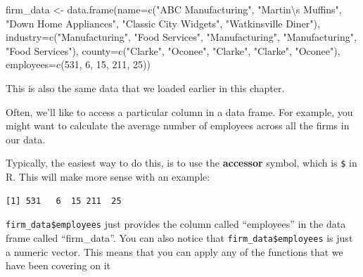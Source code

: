 \documentclass[
  letterpaper,
  DIV=11,
  numbers=noendperiod]{scrreprt}
\newenvironment{Shaded}{\begin{snugshade}}{\end{snugshade}}
\newcommand{\AttributeTok}[1]{\textcolor[rgb]{0.40,0.45,0.13}{#1}}
\newcommand{\DecValTok}[1]{\textcolor[rgb]{0.68,0.00,0.00}{#1}}
\newcommand{\FunctionTok}[1]{\textcolor[rgb]{0.28,0.35,0.67}{#1}}
\newcommand{\NormalTok}[1]{\textcolor[rgb]{0.00,0.23,0.31}{#1}}
\newcommand{\OtherTok}[1]{\textcolor[rgb]{0.00,0.23,0.31}{#1}}
\newcommand{\SpecialCharTok}[1]{\textcolor[rgb]{0.37,0.37,0.37}{#1}}
\newcommand{\StringTok}[1]{\textcolor[rgb]{0.13,0.47,0.30}{#1}}
\begin{document}
\begin{Shaded}
\begin{Highlighting}[]
\NormalTok{firm\_data }\OtherTok{\textless{}{-}} \FunctionTok{data.frame}\NormalTok{(}\AttributeTok{name=}\FunctionTok{c}\NormalTok{(}\StringTok{"ABC Manufacturing"}\NormalTok{, }\StringTok{"Martin}\SpecialCharTok{\textbackslash{}\textquotesingle{}}\StringTok{s Muffins"}\NormalTok{, }\StringTok{"Down Home Appliances"}\NormalTok{, }\StringTok{"Classic City Widgets"}\NormalTok{, }\StringTok{"Watkinsville Diner"}\NormalTok{),}
                        \AttributeTok{industry=}\FunctionTok{c}\NormalTok{(}\StringTok{"Manufacturing"}\NormalTok{, }\StringTok{"Food Services"}\NormalTok{, }\StringTok{"Manufacturing"}\NormalTok{, }\StringTok{"Manufacturing"}\NormalTok{, }\StringTok{"Food Services"}\NormalTok{),}
                        \AttributeTok{county=}\FunctionTok{c}\NormalTok{(}\StringTok{"Clarke"}\NormalTok{, }\StringTok{"Oconee"}\NormalTok{, }\StringTok{"Clarke"}\NormalTok{, }\StringTok{"Clarke"}\NormalTok{, }\StringTok{"Oconee"}\NormalTok{),}
                        \AttributeTok{employees=}\FunctionTok{c}\NormalTok{(}\DecValTok{531}\NormalTok{, }\DecValTok{6}\NormalTok{, }\DecValTok{15}\NormalTok{, }\DecValTok{211}\NormalTok{, }\DecValTok{25}\NormalTok{))}
\end{Highlighting}
\end{Shaded}

This is also the same data that we loaded earlier in this chapter.

Often, we'll like to access a particular column in a data frame. For
example, you might want to calculate the average number of employees
across all the firms in our data.

Typically, the easiest way to do this, is to use the \textbf{accessor}
symbol, which is \texttt{\$} in R. This will make more sense with an
example:

\begin{Shaded}
\end{Shaded}

\begin{verbatim}
[1] 531   6  15 211  25
\end{verbatim}

\texttt{firm\_data\$employees} just provides the column called
``employees'' in the data frame called ``firm\_data''. You can also
notice that \texttt{firm\_data\$employees} is just a numeric vector.
This means that you can apply any of the functions that we have been
covering on it
\end{document}
